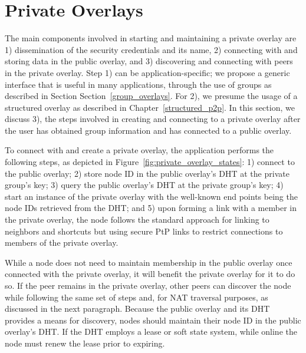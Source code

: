 \section{Private Overlays}
\label{private_overlays}
The main components involved in starting and maintaining a private overlay
are 1) dissemination of the security credentials and its name, 2) connecting
with and storing data in the public overlay, and 3) discovering and connecting
with peers in the private overlay.  Step 1) can be application-specific; we
propose a generic interface that is useful in many applications, through the
use of groups as described in Section Section~\ref{group_overlays}.  For 2),
we presume the usage of a structured overlay as described in
Chapter~\ref{structured_p2p}.  In this section, we discuss 3), the steps
involved in creating and connecting to a private overlay after the user has
obtained group information and has connected to a public overlay.

To connect with and create a private overlay, the application performs the
following steps, as depicted in Figure~\ref{fig:private_overlay_states}: 1)
connect to the public overlay; 2) store node ID in the public overlay's DHT at
the private group's key; 3) query the public overlay's DHT at the private
group's key; 4) start an instance of the private overlay with the well-known
end points being the node IDs retrieved from the DHT; and 5) upon forming a
link with a member in the private overlay, the node follows the standard
approach for linking to neighbors and shortcuts but using secure PtP links to
restrict connections to members of the private overlay.

While a node does not need to maintain membership in the public overlay once
connected with the private overlay, it will benefit the private overlay for it
to do so.  If the peer remains in the private overlay, other peers can discover
the node while following the same set of steps and, for NAT traversal purposes,
as discussed in the next paragraph.  Because the public overlay and its DHT
provides a means for discovery, nodes should maintain their node ID in the public
overlay's DHT.  If the DHT employs a lease or soft state system, while online
the node must renew the lease prior to expiring.

